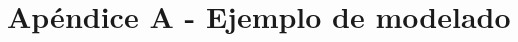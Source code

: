 \documentclass[titlepage, 12pt]{book}
\begin{document}
%
%
%
%
%


\chapter{Ap\'endice A - Ejemplo de modelado}
\label{ejemploModelado}
\end{document}
